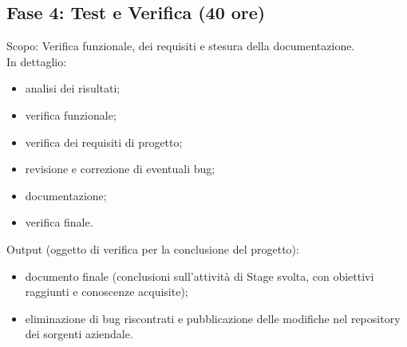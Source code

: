 \subsection{Fase 4: Test e Verifica (40 ore)}
Scopo: Verifica funzionale, dei requisiti e stesura della documentazione.\\
In dettaglio:
\begin{itemize}
	\item analisi dei risultati;
	\item verifica funzionale;
	\item verifica dei requisiti di progetto;
	\item revisione e correzione di eventuali bug;
	\item documentazione;
	\item verifica finale.
\end{itemize}
Output (oggetto di verifica per la conclusione del progetto):
\begin{itemize}
	\item documento finale (conclusioni sull'attività di Stage svolta, con obiettivi raggiunti e
conoscenze acquisite);
	\item eliminazione di bug riscontrati e pubblicazione delle modifiche nel repository dei sorgenti aziendale.
\end{itemize}


